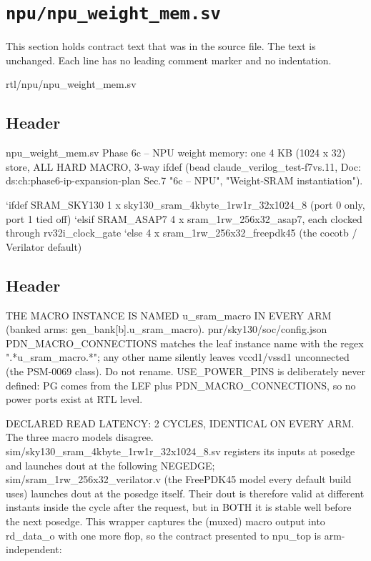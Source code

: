 \section{\texttt{npu/npu\_weight\_mem.sv}}\label{ds:mod:npu-weight-mem}

This section holds contract text that was in the source file. The text is unchanged. Each line has no leading comment marker and no indentation.

\begin{relocated}{rtl/npu/npu_weight_mem.sv}

\subsection*{Header}

\begin{textblock}
npu_weight_mem.sv
Phase 6c -- NPU weight memory: one 4 KB (1024 x 32) store, ALL HARD MACRO, 3-way ifdef
(bead claude_verilog_test-f7vs.11, Doc: ds:ch:phase6-ip-expansion-plan Sec.7 "6c -- NPU",
"Weight-SRAM instantiation").

  `ifdef SRAM_SKY130   1 x sky130_sram_4kbyte_1rw1r_32x1024_8   (port 0 only, port 1 tied off)
  `elsif SRAM_ASAP7    4 x sram_1rw_256x32_asap7, each clocked through rv32i_clock_gate
  `else                4 x sram_1rw_256x32_freepdk45            (the cocotb / Verilator default)
\end{textblock}

\subsection*{Header}

\begin{textblock}
THE MACRO INSTANCE IS NAMED u_sram_macro IN EVERY ARM (banked arms: gen_bank[b].u_sram_macro).
pnr/sky130/soc/config.json PDN_MACRO_CONNECTIONS matches the leaf instance name with the regex
".*u_sram_macro.*"; any other name silently leaves vccd1/vssd1 unconnected (the PSM-0069 class).
Do not rename. USE_POWER_PINS is deliberately never defined: PG comes from the LEF plus
PDN_MACRO_CONNECTIONS, so no power ports exist at RTL level.

DECLARED READ LATENCY: 2 CYCLES, IDENTICAL ON EVERY ARM.
  The three macro models disagree. sim/sky130_sram_4kbyte_1rw1r_32x1024_8.sv registers its inputs
  at posedge and launches dout at the following NEGEDGE; sim/sram_1rw_256x32_verilator.v (the
  FreePDK45 model every default build uses) launches dout at the posedge itself. Their dout is
  therefore valid at different instants inside the cycle after the request, but in BOTH it is
  stable well before the next posedge. This wrapper captures the (muxed) macro output into
  rd_data_o with one more flop, so the contract presented to npu_top is arm-independent:


\end{textblock}
\end{relocated}
